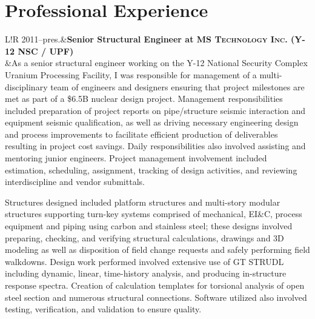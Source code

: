 \documentclass[11pt,letterpaper]{article}
\newcommand\VRule{\color{lightgray}\vrule width 0.5pt}
\begin{document}
\section*{Professional Experience}
\begin{tabular}{L!{\VRule}R}
2011--pres.&{\bf Senior Structural Engineer at \fontsize{12}{12}\textsc{MS Technology Inc. (Y-12 NSC / UPF)}}\\
&As a senior structural engineer working on the Y-12 National Security Complex Uranium Processing Facility, I was responsible for management of a multi-disciplinary team of engineers and designers ensuring that project milestones are met as part of a \$6.5B nuclear design project. Management responsibilities included preparation of project reports on pipe/structure seismic interaction and equipment seismic qualification, as well as driving necessary engineering design and process improvements to facilitate efficient production of deliverables resulting in project cost savings. Daily responsibilities also involved assisting and mentoring junior engineers. Project management involvement included estimation, scheduling, assignment, tracking of design activities, and reviewing interdiscipline and vendor submittals.
\vspace{0.9em}
\par
Structures designed included platform structures and multi-story modular structures supporting turn-key systems comprised of mechanical, EI\&C, process equipment and piping using carbon and stainless steel; these designs involved preparing, checking, and verifying structural calculations, drawings and 3D modeling as well as disposition of field change requests and safely performing field walkdowns. Design work performed involved extensive use of GT STRUDL including dynamic, linear, time-history analysis, and producing in-structure response spectra. Creation of calculation templates for torsional analysis of open steel section and numerous structural connections. Software utilized also involved testing, verification, and validation to ensure quality.
\\[6pt]
\par\vspace{0.3em} 
\end{tabular}
\end{document}
